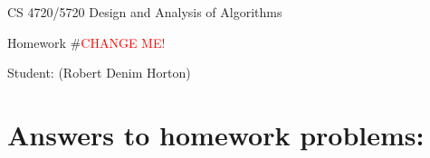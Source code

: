 \documentclass[11pt]{article}
\begin{document}
 

\rhead{\today}

\begin{center}\begin{Large}
CS 4720/5720 Design and Analysis of Algorithms

Homework \#\textcolor{red}{CHANGE ME!}

Student: (Robert Denim Horton)
\end{Large}
\end{center}

\section*{Answers to homework problems:}

\end{document}
